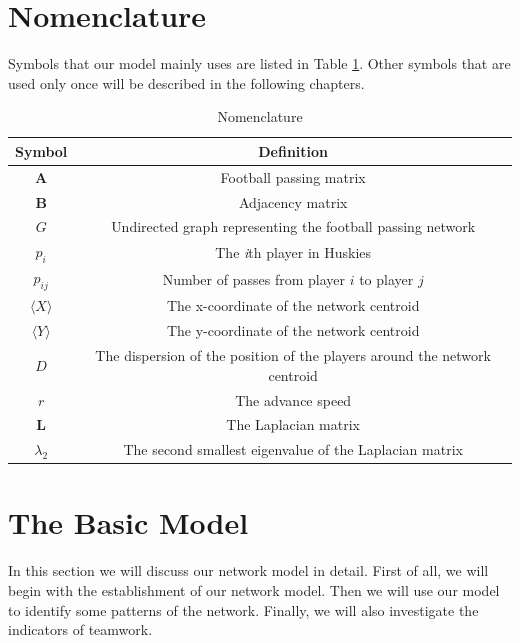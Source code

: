\documentclass{mcmthesis}
\begin{document}
\section{Nomenclature}
	Symbols that our model mainly uses are listed in Table \ref{tab:Nomen}.  Other symbols that are used only once will be described in the following chapters.
	\begin{table}
    	\centering
    	\caption{Nomenclature}
		\label{tab:Nomen}
		\begin{tabular}{c c}
			\hline	
				Symbol & Definition\\
			\hline
				$\textbf{A}$ & Football passing matrix\\
				$\textbf{B}$ & Adjacency matrix\\
				$G$ & Undirected graph representing the football passing network\\
				$p_{i}$ & The \emph{i}th player in Huskies\\
				$p_{ij}$ & Number of passes from player $i$ to player $j$\\
				$\langle$$X$$\rangle$ & The x-coordinate of the network centroid\\
				$\langle$$Y$$\rangle$ & The y-coordinate of the network centroid\\
				$D$ & The dispersion of the position of the players around the network centroid\\
				$r$ & The advance speed\\
				$\textbf{L}$ & The Laplacian matrix\\
				$\lambda_{2}$ & The second smallest eigenvalue of the Laplacian matrix\\
			\hline
   	 	\end{tabular}
	\end{table}

\section{The Basic Model}
	In this section we will discuss our network model in detail.  First of all, we will begin with the establishment of our network model.  Then we will use our model to identify some patterns of the network.  Finally, we will also investigate the indicators of teamwork. 
\end{document}
